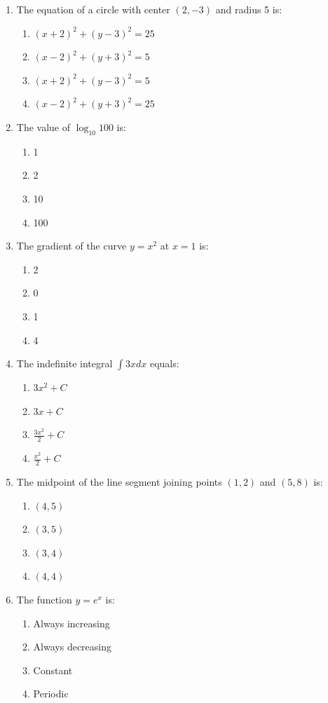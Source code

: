 \documentclass{../Templates/sbs-exam}
\begin{document}
\begin{enumerate}
    \item The equation of a circle with center $(2, -3)$ and radius 5 is:
    \begin{enumerate}
        \item $(x+2)^2 + (y-3)^2 = 25$
        \item $(x-2)^2 + (y+3)^2 = 5$
        \item $(x+2)^2 + (y-3)^2 = 5$
        \item $(x-2)^2 + (y+3)^2 = 25$
    \end{enumerate}
    
    \item The value of $\log_{10} 100$ is:
    \begin{enumerate}
        \item 1
        \item 2
        \item 10
        \item 100
    \end{enumerate}
    
    \item The gradient of the curve $y = x^2$ at $x=1$ is:
    \begin{enumerate}
        \item 2
        \item 0
        \item 1
        \item 4
    \end{enumerate}
    
    \item The indefinite integral $\int 3x  dx$ equals:
    \begin{enumerate}
        \item $3x^2 + C$
        \item $3x + C$
        \item $\frac{3x^2}{2} + C$
        \item $\frac{x^2}{2} + C$
    \end{enumerate}
    
    \item The midpoint of the line segment joining points $(1, 2)$ and $(5, 8)$ is:
    \begin{enumerate}
        \item $(4, 5)$
        \item $(3, 5)$
        \item $(3, 4)$
        \item $(4, 4)$
    \end{enumerate}
    
    \item The function $y = e^x$ is:
    \begin{enumerate}
        \item Always increasing
        \item Always decreasing
        \item Constant
        \item Periodic
    \end{enumerate}
\end{enumerate}
\end{document}
